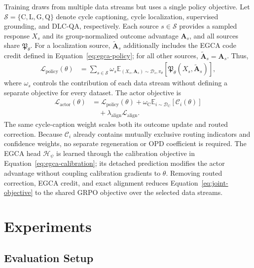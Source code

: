 \documentclass{article}
\begin{document}
Training draws from multiple data streams but uses a single policy objective. Let $\mathcal S=\{\mathrm{C},\mathrm{L},\mathrm{G},\mathrm{Q}\}$ denote cycle captioning, cycle localization, supervised grounding, and DLC-QA, respectively. Each source $s\in\mathcal S$ provides a sampled response $X_s$ and its group-normalized outcome advantage $\mathbf A_s$, and all sources share $\mathfrak P_\theta$. For a localization source, $\widetilde{\mathbf A}_s$ additionally includes the EGCA code credit defined in Equation~\eqref{eq:egca-policy}; for all other sources, $\widetilde{\mathbf A}_s=\mathbf A_s$. Thus,
\begin{equation}\label{eq:unified-policy}\begin{aligned}
 \mathcal L_{\mathrm{policy}}(\theta)
 &=\sum_{s\in\mathcal S}\omega_s
 \mathbb E_{(X_s,\mathbf A_s)\sim\mathcal D_s,\pi_\theta}
 \!\left[\mathfrak P_\theta(X_s,\widetilde{\mathbf A}_s)\right],
\end{aligned}\end{equation}
where $\omega_s$ controls the contribution of each data stream without defining a separate objective for every dataset. The actor objective is
\begin{equation}\label{eq:joint-objective}\begin{aligned}
 \mathcal L_{\mathrm{actor}}(\theta)
 &=\mathcal L_{\mathrm{policy}}(\theta)
 +\omega_{\mathrm{C}}
 \mathbb E_{i\sim\mathcal D_{\mathrm{C}}}[\mathcal C_i(\theta)]\\
 &\quad+\lambda_{\mathrm{align}}\mathcal L_{\mathrm{align}}.
\end{aligned}\end{equation}
The same cycle-caption weight scales both its outcome update and routed correction. Because $\mathcal C_i$ already contains mutually exclusive routing indicators and confidence weights, no separate regeneration or OPD coefficient is required. The EGCA head $\mathcal H_\psi$ is learned through the calibration objective in Equation~\eqref{eq:egca-calibration}; its detached prediction modifies the actor advantage without coupling calibration gradients to $\theta$. Removing routed correction, EGCA credit, and exact alignment reduces Equation~\eqref{eq:joint-objective} to the shared GRPO objective over the selected data streams.


\section{Experiments}
\label{sec:experiments}
\subsection{Evaluation Setup}
\end{document}
